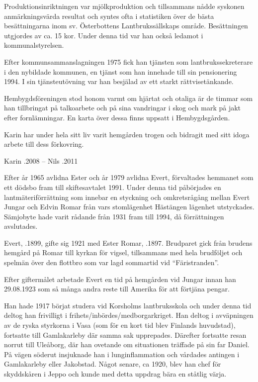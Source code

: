 Produktionsinriktningen var mjölkproduktion och tillsammans nådde syskonen anmärkningsvärda resultat och syntes ofta i statistiken över de bästa besättningarna inom sv. Österbottens Lantbrukssällskaps område. Besättningen utgjordes av ca. 15 kor. Under denna tid var han också ledamot i kommunalstyrelsen.

Efter kommunsammanslagningen 1975 fick han tjänsten som lantbrukssekreterare i den nybildade kommunen, en tjänst som han innehade till sin pensionering 1994. I sin tjänsteutövning var han besjälad av ett starkt rättvisetänkande.

Hembygdsföreningen stod honom varmt om hjärtat och otaliga är de timmar som han tillbringat på talkoarbete och på sina vandringar i skog och mark på jakt efter fornlämningar. En karta över dessa finns uppsatt i Hembygdsgården.

Karin har under hela sitt liv varit hemgården trogen och bidragit med sitt idoga arbete till dess förkovring.

Karin .2008  --  Nils .2011



Efter år 1965 avlidna Ester och år 1979 avlidna Evert, förvaltades hemmanet som ett dödsbo fram till skiftesavtalet 1991. Under denna tid påbörjades en lantmäteriförrättning som innebar en styckning och omkretsrågång mellan Evert Jungar och Edvin Romar från vars stomlägenhet Hästängen lägenhet utstyckades. Sämjobyte hade varit rådande från 1931 fram till 1994, då förrättningen avslutades.


Evert, .1899, gifte sig 1921 med Ester Romar, .1897. Brudparet gick från brudens hemgård på Romar till kyrkan för vigsel, tillsammans med hela brudföljet och spelmän över den flottbro som var lagd sommartid vid ``Färistranden''.



Efter giftermålet arbetade Evert en tid på hemgården vid Jungar innan han 29.08.1923 som så många andra reste till Amerika för att förtjäna pengar.

Han hade 1917 börjat studera vid Korsholms lantbruksskola och under denna tid deltog han frivilligt i frihets/inbördes/medborgarkriget. Han deltog i avväpningen av de ryska styrkorna i Vasa (som för en kort tid blev Finlands huvudstad), fortsatte till Gamlakarleby där samma sak upprepades. Därefter fortsatte resan norrut till Uleåborg, där han ovetande om situationen träffade på sin far Daniel. På vägen söderut insjuknade han i lunginflammation och vårdades antingen i Gamlakarleby eller Jakobstad. Något senare, ca 1920, blev han chef för skyddskåren i Jeppo och kunde med detta uppdrag bära en ståtlig värja.

